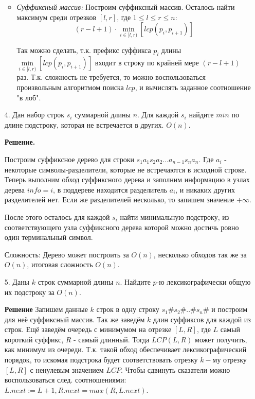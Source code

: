 \begin{enumerate}
\begin{itemize}
		\item \textit{Суффиксный массив:} Построим суффиксный массив. Осталось найти максимум среди отрезков $[l, 
		r]$, где $1 \leq l \leq r \leq n$:
		\begin{equation*}
			(r - l + 1) \cdot \min \limits_{i \in [l, r)} \left[ lcp(p_i, p_{i + 1}) \right]
		\end{equation*}
		
		Так можно сделать, т.к. префикс суффикса $p_l$ длины $\min \limits_{i \in [l, r)} \left[ lcp(p_i, p_{i + 
		1}) \right]$ входит в строку по крайней мере $(r - l + 1)$ раз. Т.к. сложность не требуется, то можно 
		воспользоваться произвольным алгоритмом поиска $lcp$, и вычислять заданное соотношение "в лоб".
		
	\end{itemize}
	\item[4.] Дан набор строк $s_i$ суммарной длины $n$. Для каждой $s_i$ найдите $min$ по длине подстроку, 
	которая не встречается в других. $O(n)$.
	
	\textbf{Решение.} 
	
	Построим суффиксное дерево для строки $s_1a_1s_2a_2\dots a_{n - 1}s_na_n$. Где $a_i$ - некоторые 
	символы-разделители, которые не встречаются в исходной строке. Теперь выполним обход суффиксного дерева и 
	заполним информацию в узлах дерева $info = i$, в поддереве находится разделитель $a_i$, и никаких других 
	разделителей нет. Если же разделителей несколько, то запишем значение $+\infty$. 
	
	После этого осталось для каждой $s_i$ найти минимальную подстроку, из соответствующего узла суффиксного 
	дерева которой можно достичь ровно один терминальный символ.
	
	Сложность: Дерево может построить за $O(n)$, несколько обходов так же за $O(n)$, итоговая сложность $O(n)$.
	
	\item[5.] Даны $k$ строк суммарной длины $n$. Найдите $p$-ю лексикографически общую их подстроку за $O(n)$.
	
	\textbf{Решение} Запишем данные $k$ строк в одну строку $s_1\#s_2\#..\#s_n\#$ и построим для неё суффиксный 
	массив. Так же заведём $k$ длин суффиксов для каждой из строк.  Ещё заведём очередь с минимумом на отрезке 
	$[L, R]$, где $L$ самый короткий суффикс, $R$ - самый длинный. Тогда $LCP(L,R)$ может получить, как минимум 
	из очереди. Т.к. такой обход обеспечивает лексикографический порядок, то искомая подстрока будет 
	соответствовать отрезку $k-$му отрезку $[L, R]$ с ненулевым значением $LCP$. Чтобы сдвинуть сказатели можно 
	воспользоваться след. соотношениями: $L.next := L + 1, R.next = max(R, L.next)$.
\end{enumerate}
